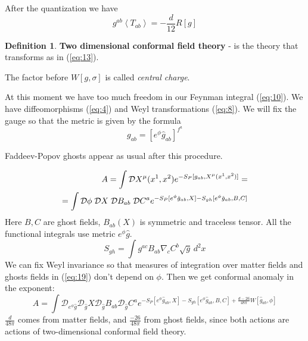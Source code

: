 \documentclass[a4paper,12pt]{article}
\theoremstyle{definition} \newtheorem{Def}{Definition}
\begin{document}
After the quantization we have
\begin{equation}
  \label{eq:17}
  g^{ab}\left< T_{ab} \right> = -\frac{d}{12} R[g]
\end{equation}
\begin{Def}
  {\bf Two dimensional conformal field theory} - is the theory that transforms as in (\ref{eq:13}).

  The factor before $W[g,\sigma]$ is called {\it central charge}.
\end{Def}


At this moment we have too much freedom in our Feynman integral (\ref{eq:10}). We have diffeomorphisms (\ref{eq:4}) and Weyl transformations (\ref{eq:8}). We will fix the gauge so that the metric is given by the formula 
\begin{equation}
  \label{eq:20}
  g_{ab}=[e^{\phi} \hat{g}_{ab}]^{f^a}
\end{equation}

Faddeev-Popov ghosts appear as usual after this procedure.

\begin{equation}
  \label{eq:19}
  \begin{split}
    A=\int {\cal D} X^{\mu}(x^1,x^2)e^{-S_P[g_{ab},X^{\mu}(x^1,x^2)]} = \\
    = \int {\cal D}\phi\; {\cal D}X\; \mathcal{D} B_{ab}\; \mathcal{D} C^a e^{-S_P [e^{\phi}\hat{g}_{ab},X]-
      S_{gh}[e^{\phi}\hat{g}_{ab},B,C]}
  \end{split}
\end{equation}
Here $B,C$ are ghost fields, $B_{ab}(X)$ is symmetric and traceless tensor. All the functional integrals use metric $e^{\phi}\hat{g}$. 
\begin{equation}
  \label{eq:21}
  S_{gh} = \int g^{ac} B_{ab} \nabla_c C^b \sqrt{g} \, d^2x
\end{equation}
We can fix Weyl invariance so that measures of integration over matter fields and ghosts fields in (\ref{eq:19}) don't depend on $\phi$. Then we get conformal anomaly in the exponent:
\begin{equation}
  \label{eq:22}
  A = \int \mathcal{D}_{e^{\phi} \hat{g}} \mathcal{D}_{\hat{g}} X \mathcal{D}_{\hat{g}} B_{ab} \mathcal{D}_{\hat{g}} C^a e^{-S_P [e^{\phi}\hat{g}_{ab},X]-S_{gh}[e^{\phi}\hat{g}_{ab},B,C]+\frac{d-26}{48\pi} W[\hat{g}_{ab},\phi]}
\end{equation}
$\frac{d}{48\pi}$ comes from matter fields, and $\frac{-26}{48\pi}$ from ghost fields, since both actions are actions of two-dimensional conformal field theory.
\end{document}
